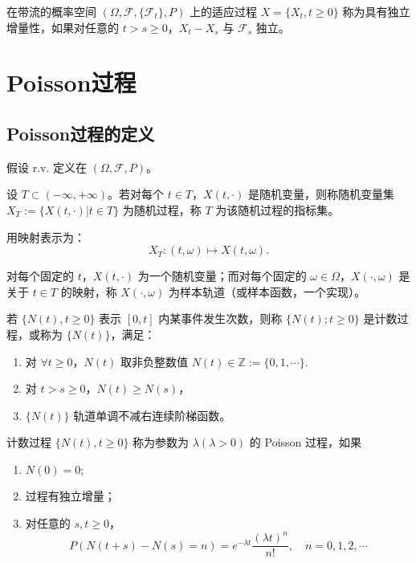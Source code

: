\documentclass[lang=cn,10pt,thmcnt=section]{elegantbook}
\begin{document}
\begin{definition}
	在带流的概率空间 $(\Omega, \mathcal{F}, \{\mathcal{F}_t\}, P)$ 上的适应过程 $X = \{X_t, t \geq 0\}$ 称为具有独立增量性，如果对任意的 $t > s \geq 0$，$X_t - X_s$ 与 $\mathcal{F}_s$ 独立。

\end{definition}

\chapter{Poisson过程}

\section{Poisson过程的定义}
假设 r.v. 定义在 $(\Omega, \mathcal{F}, P)$。


\begin{definition}
	设 $T \subset (-\infty, +\infty)$。若对每个 $t \in T$，$X(t, \cdot)$ 是随机变量，则称随机变量集 $X_T := \{X(t, \cdot) | t \in T\}$ 为随机过程，称 $T$ 为该随机过程的指标集。

用映射表示为：
\[
X_T : (t, \omega) \mapsto X(t, \omega).
\]

对每个固定的 $t$，$X(t, \cdot)$ 为一个随机变量；而对每个固定的 $\omega \in \Omega$，$X(\cdot, \omega)$ 是关于 $t \in T$ 的映射，称 $X(\cdot, \omega)$ 为样本轨道（或样本函数，一个实现）。
\end{definition}

\begin{definition}
	若 $\{N(t), t \geq 0\}$ 表示 $[0,t]$ 内某事件发生次数，则称 $\{N(t); t \geq 0\}$ 是计数过程，或称为 $\{N(t)\}$，满足：
\begin{enumerate}
    \item 对 $\forall t \geq 0$，$N(t)$ 取非负整数值 $N(t) \in \mathbb{Z} := \{0, 1, \cdots\}$.
    \item 对 $t > s \geq 0$，$N(t) \geq N(s)$，
    \item $\{N(t)\}$ 轨道单调不减右连续阶梯函数。
\end{enumerate}
\end{definition}

\begin{definition}
	计数过程 $\{N(t), t \geq 0\}$ 称为参数为 $\lambda (\lambda > 0)$ 的 Poisson 过程，如果
\begin{enumerate}
    \item $N(0) = 0$;
    \item 过程有独立增量；
    \item 对任意的 $s, t \geq 0$，
    \[
    P(N(t + s) - N(s) = n) = e^{-\lambda t} \frac{(\lambda t)^n}{n!}, \quad n = 0, 1, 2, \cdots
    \]
\end{enumerate}
\end{definition}
\end{document}

